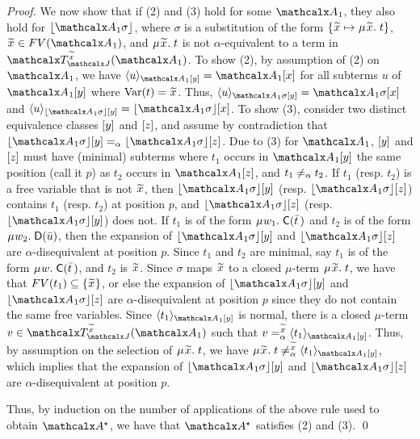 \begin{rep}
\begin{proof}
We now show that if (2) and (3) hold for some $\Val_1$,
they also hold for $\nf{\Val_1 \sigma}$,
where $\sigma$ is a substitution of the form $\{ {\Varec{x}} \mapsto \MU{\Varec{x}}.\; t \}$,
${\Varec{x}} \in FV( \Val_1 )$,
and $\MU {\Varec{x}}.\; t$ is not $\alpha$-equivalent to a term in $\Terms_{\smash{\J}}^{\Varec{x}}(\Val_1)$.
To show (2),
by assumption of (2) on $\Val_1$, we have $\expand{\Val_1 \ec{y}}{ u } = \Val_1 \ec{x}$ for
all subterms $u$ of $\Val_1 \ec{y}$ where $\muvar(t) = {\Varec{x}}$.
Thus, $\expand{\Val_1 \sigma \ec{y}}{ u } = \Val_1 \sigma \ec{x}$ and
$\expand{\nf{\Val_1 \sigma} \ec{y}}{ u } = \nf{\Val_1 \sigma} \ec{x}$.
To show (3),
consider two distinct equivalence classes $[y]$ and $[z]$,
and assume by contradiction that $\nf{\Val_1 \sigma} \ec{y} \aequiv \nf{\Val_1 \sigma} \ec{z}$.
Due to (3) for $\Val_1$,
$[y]$ and $[z]$ must have (minimal) subterms
where $t_1$ occurs in $\Val_1 \ec{y}$ the same position (call it $p$) as $t_2$ occurs in $\Val_1 \ec{z}$,
and $t_1 \not\mathrel{=_\alpha} t_2$.
If $t_1$ (resp. $t_2$) is a free variable that is not ${\Varec{x}}$,
then $\nf{\Val_1 \sigma} \ec{y}$ (resp. $\nf{\Val_1 \sigma} \ec{z}$)
contains $t_1$ (resp. $t_2$) at position $p$,
and $\nf{\Val_1 \sigma} \ec{z}$ (resp. $\nf{\Val_1 \sigma} \ec{y}$) does not.
If $t_1$ is of the form $\MU w_1.\; \const{C}( \vec t \,)$
and $t_2$ is of the form $\MU w_2.\; \const{D}( \vec u )$,
then the expansion %
of $\nf{\Val_1 \sigma} \ec{y}$ and $\nf{\Val_1 \sigma} \ec{z}$
are $\alpha$-disequivalent at position $p$.
Since $t_1$ and $t_2$ are minimal,
say $t_1$ is of the form $\MU w.\; \const{C}( \vec t \,)$,
and $t_2$ is ${\Varec{x}}$.
Since $\sigma$ maps ${\Varec{x}}$ to a closed $\mu$-term $\MU {\Varec{x}}.\; t$,
we have that $FV( t_1 ) \subseteq \{ {\Varec{x}} \}$,
or else the expansion of $\nf{\Val_1 \sigma} \ec{y}$ and $\nf{\Val_1 \sigma} \ec{z}$
are $\alpha$-disequivalent at position $p$ since they do not contain the same free variables.
Since $\expand{\Val_1 \ec{y}}{t_1}$ is normal,
there is a closed $\mu$-term $v \in \Terms_{\smash{\J}}^{\Varec{x}}( \Val_1 )$
such that $v \vsimv{\Varec{x}} \expand{\Val_1 \ec{y}}{t_1}$.
Thus, by assumption on the selection of $\MU {\Varec{x}}.\; t$,
we have $\MU {\Varec{x}}.\; t \not\vsimv{\Varec{x}} \expand{\Val_1 \ec{y}}{t_1}$,
which implies that the expansion of $\nf{\Val_1 \sigma} \ec{y}$ and $\nf{\Val_1 \sigma} \ec{z}$
are $\alpha$-disequivalent at position $p$. %

Thus, by induction on the number of applications of the above rule used to obtain $\ValC$,
we have that $\ValC$ satisfies (2) and (3).
\qed
\end{proof}
\end{rep}

